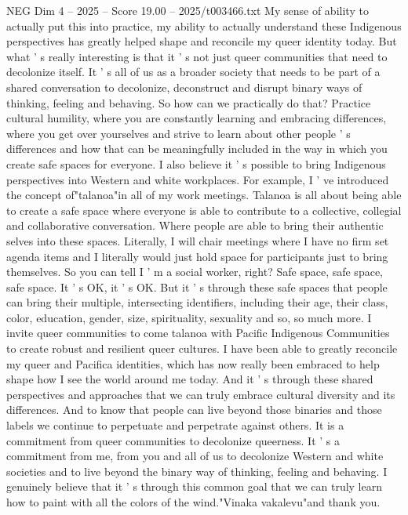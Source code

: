 \begin{textsample}{NEG Dim 4 – 2025 – Score 19.00 – 2025/t003466.txt}
My sense of ability to actually put this into practice, my ability to actually understand these Indigenous perspectives has greatly helped shape and reconcile my queer identity today.
But what ' s really interesting is that it ' s not just queer communities that need to decolonize itself.
It ' s all of us as a broader society that needs to be part of a shared conversation to decolonize, deconstruct and disrupt binary ways of thinking, feeling and behaving.
So how can we practically do that?
Practice cultural humility, where you are constantly learning and embracing differences, where you get over yourselves and strive to learn about other people ' s differences and how that can be meaningfully included in the way in which you create safe spaces for everyone.
I also believe it ' s possible to bring Indigenous perspectives into Western and white workplaces.
For example, I ' ve introduced the concept of"talanoa"in all of my work meetings.
Talanoa is all about being able to create a safe space where everyone is able to contribute to a collective, collegial and collaborative conversation.
Where people are able to bring their authentic selves into these spaces.
Literally, I will chair meetings where I have no firm set agenda items and I literally would just hold space for participants just to bring themselves.
So you can tell I ' m a social worker, right?
Safe space, safe space, safe space.
It ' s OK, it ' s OK.
But it ' s through these safe spaces that people can bring their multiple, intersecting identifiers, including their age, their class, color, education, gender, size, spirituality, sexuality and so, so much more.
I invite queer communities to come talanoa with Pacific Indigenous Communities to create robust and resilient queer cultures.
I have been able to greatly reconcile my queer and Pacifica identities, which has now really been embraced to help shape how I see the world around me today.
And it ' s through these shared perspectives and approaches that we can truly embrace cultural diversity and its differences.
And to know that people can live beyond those binaries and those labels we continue to perpetuate and perpetrate against others.
It is a commitment from queer communities to decolonize queerness.
It ' s a commitment from me, from you and all of us to decolonize Western and white societies and to live beyond the binary way of thinking, feeling and behaving.
I genuinely believe that it ' s through this common goal that we can truly learn how to paint with all the colors of the wind."Vinaka vakalevu"and thank you.

\end{textsample}
